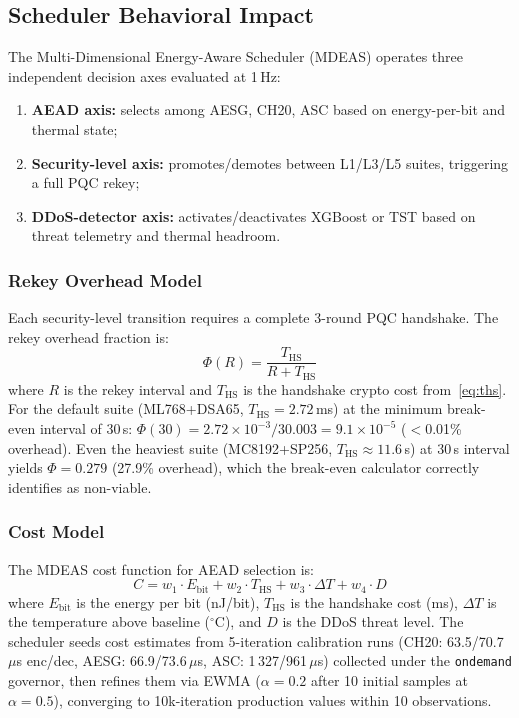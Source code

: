 \subsection{Scheduler Behavioral Impact}
\label{sec:scheduler}

The Multi-Dimensional Energy-Aware Scheduler (MDEAS) operates three
independent decision axes evaluated at 1\,Hz:

\begin{enumerate}
\item \textbf{AEAD axis:} selects among AESG, CH20, ASC based on
  energy-per-bit and thermal state;
\item \textbf{Security-level axis:} promotes/demotes between L1/L3/L5
  suites, triggering a full PQC rekey;
\item \textbf{DDoS-detector axis:} activates/deactivates XGBoost or
  TST based on threat telemetry and thermal headroom.
\end{enumerate}

\subsubsection{Rekey Overhead Model}

Each security-level transition requires a complete 3-round PQC
handshake.  The rekey overhead fraction is:
\begin{equation}
\Phi(R) = \frac{T_\text{HS}}{R + T_\text{HS}}
\label{eq:rekey}
\end{equation}
where $R$ is the rekey interval and $T_\text{HS}$ is the handshake
crypto cost from~\eqref{eq:ths}.  For the default suite (ML768+DSA65,
$T_\text{HS} = 2.72$\,ms) at the minimum break-even interval of 30\,s:
$\Phi(30) = 2.72 \times 10^{-3} / 30.003 = 9.1 \times 10^{-5}$
($<$0.01\% overhead).  Even the heaviest suite (MC8192+SP256,
$T_\text{HS} \approx 11.6$\,s) at 30\,s interval yields
$\Phi = 0.279$ (27.9\% overhead), which the break-even calculator
correctly identifies as non-viable.

\subsubsection{Cost Model}

The MDEAS cost function for AEAD selection is:
\begin{equation}
C = w_1 \cdot E_\text{bit} + w_2 \cdot T_\text{HS}
  + w_3 \cdot \Delta T + w_4 \cdot D
\label{eq:cost}
\end{equation}
where $E_\text{bit}$ is the energy per bit (nJ/bit), $T_\text{HS}$ is the
handshake cost (ms), $\Delta T$ is the temperature above baseline
($^\circ$C), and $D$ is the DDoS threat level.  The scheduler seeds
cost estimates from 5-iteration calibration runs
(CH20: 63.5/70.7\,$\mu$s enc/dec, AESG: 66.9/73.6\,$\mu$s,
ASC: 1\,327/961\,$\mu$s) collected under the \texttt{ondemand}
governor, then refines them via EWMA ($\alpha = 0.2$ after 10
initial samples at $\alpha = 0.5$), converging to 10k-iteration
production values within 10 observations.

